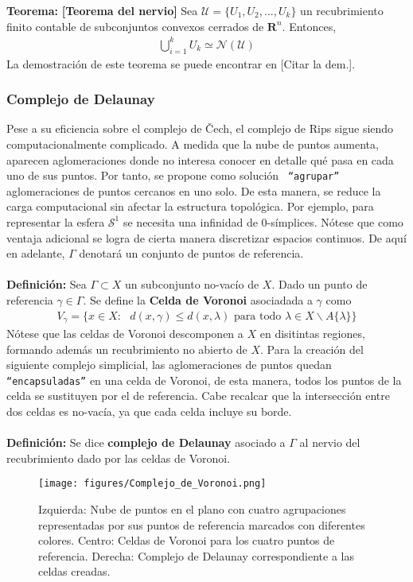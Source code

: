 \documentclass[a4paper,11pt]{article}
\begin{document}
\textbf{Teorema:} \textbf{[Teorema del nervio]} Sea $\mathcal{U}=\{U_{1}, U_{2}, ... ,U_{k}\}$ un recubrimiento finito contable de subconjuntos convexos cerrados de $\mathbf{R}^n$. Entonces, 
\begin{align*}
    \bigcup_{i=1}^{k}U_{k} \simeq \mathcal{N}(\mathcal{U})
\end{align*}
La demostración de este teorema se puede encontrar en [Citar la dem.]. 



\subsubsection*{Complejo de Delaunay}
Pese a su eficiencia sobre el complejo de Čech, el complejo de Rips sigue siendo computacionalmente complicado. A medida que la nube de puntos aumenta, aparecen aglomeraciones donde no interesa conocer en detalle qué pasa en cada uno de sus puntos. Por tanto, se propone como solución \texttt{
``agrupar''} aglomeraciones de puntos cercanos en uno solo. De esta manera, se reduce la carga computacional sin afectar la estructura topológica. Por ejemplo, para representar la esfera $\mathcal{S}^1$ se necesita una infinidad de 0-símplices. Nótese que como ventaja adicional se logra de cierta manera discretizar espacios continuos. De aquí en adelante, $\Gamma$ denotará un conjunto de puntos de referencia.\\
\\
\textbf{Definición:} Sea $\Gamma \subset X$ un subconjunto no-vacío de $X$. Dado un punto de referencia $\gamma \in \Gamma$. Se define la \textbf{Celda de Voronoi} asociadada a $\gamma$ como
\begin{align*}
    V_{\gamma}=\{x \in X: \text{ } d(x,\gamma) \leq d(x,\lambda) \text{ para todo } \lambda \in X\backslash A \{ \lambda\}\}
\end{align*}
Nótese que las celdas de Voronoi descomponen a $X$ en disitintas regiones, formando además un recubrimiento no abierto de $X$. Para la creación del siguiente complejo simplicial, las aglomeraciones de puntos quedan \texttt{``encapsuladas''} en una celda de Voronoi, de esta manera, todos los puntos de la celda se sustituyen por el de referencia. Cabe recalcar que la intersección entre dos celdas es no-vacía, ya que cada celda incluye su borde.\\
\\
\textbf{Definición:} Se dice \textbf{complejo de Delaunay} asociado a $\Gamma$ al nervio del recubrimiento dado por las celdas de Voronoi.%
\begin{figure}[!htb]
  \centering
  \texttt{[image: figures/Complejo\_de\_Voronoi.png]}
  \caption{Izquierda: Nube de puntos en el plano con cuatro agrupaciones representadas por sus puntos de referencia marcados con diferentes colores. Centro: Celdas de Voronoi para los cuatro puntos de referencia. Derecha: Complejo de Delaunay correspondiente a las celdas creadas.}
\end{figure}
\end{document}

